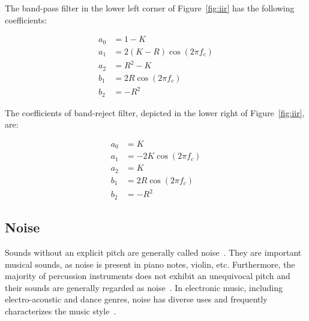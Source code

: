 \begin{enumerate}
The band-pass filter in the lower left corner of Figure~\ref{fig:iir} has the following coefficients:

\begin{equation}\label{eq:passa-banda}
 \begin{split}
 a_0 & =  1 - K \\
 a_1 & =  2(K-R)\cos (2\pi f_c) \\
 a_2 & =  R^2-K \\
 b_1 & =  2R \cos (2\pi f_c) \\
 b_2 & =  -R^2
 \end{split}
\end{equation}

The coefficients of band-reject filter, depicted in the lower right of Figure~\ref{fig:iir}, are:

\begin{equation}\label{eq:rejeita-banda}
 \begin{split}
 a_0 & =  K \\
 a_1 & =  -2K\cos (2\pi f_c) \\
 a_2 & =  K \\
 b_1 & =  2R \cos (2\pi f_c) \\
 b_2 & =  -R^2
\end{split}
\end{equation}


\end{enumerate}

\subsection{Noise}\label{subsec:ruidos}

Sounds without an explicit pitch are generally called noise~\cite{Lacerda}. They are important musical sounds, as noise is present in piano notes, violin, etc. Furthermore, the majority of percussion instruments does not exhibit an unequivocal pitch and their sounds are generally regarded as noise~\cite{Roederer}. In electronic music, including electro-acoustic and dance genres, noise has diverse uses and frequently characterizes the music style~\cite{Cook}. 

